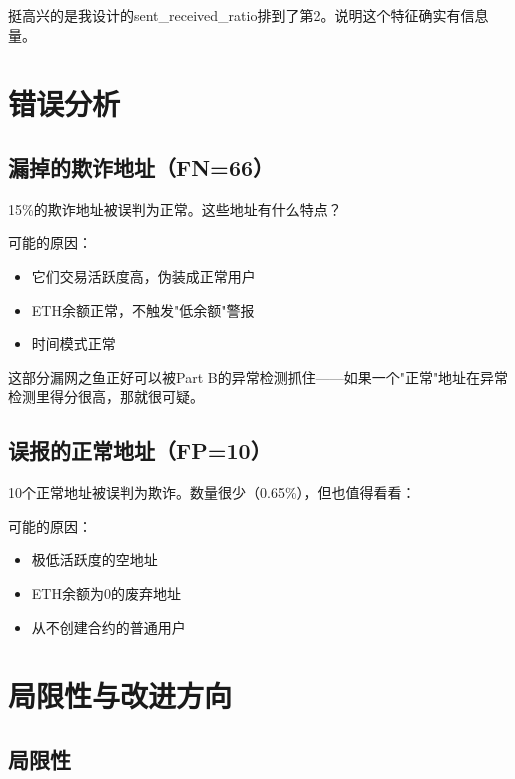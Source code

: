 \documentclass[12pt,a4paper]{article}
\begin{document}
挺高兴的是我设计的sent\_received\_ratio排到了第2。说明这个特征确实有信息量。

\section{错误分析}

\subsection{漏掉的欺诈地址（FN=66）}

15\%的欺诈地址被误判为正常。这些地址有什么特点？

可能的原因：
\begin{itemize}
    \item 它们交易活跃度高，伪装成正常用户
    \item ETH余额正常，不触发"低余额"警报
    \item 时间模式正常
\end{itemize}

这部分漏网之鱼正好可以被Part B的异常检测抓住——如果一个"正常"地址在异常检测里得分很高，那就很可疑。

\subsection{误报的正常地址（FP=10）}

10个正常地址被误判为欺诈。数量很少（0.65\%），但也值得看看：

可能的原因：
\begin{itemize}
    \item 极低活跃度的空地址
    \item ETH余额为0的废弃地址
    \item 从不创建合约的普通用户
\end{itemize}

\section{局限性与改进方向}

\subsection{局限性}
\end{document}
